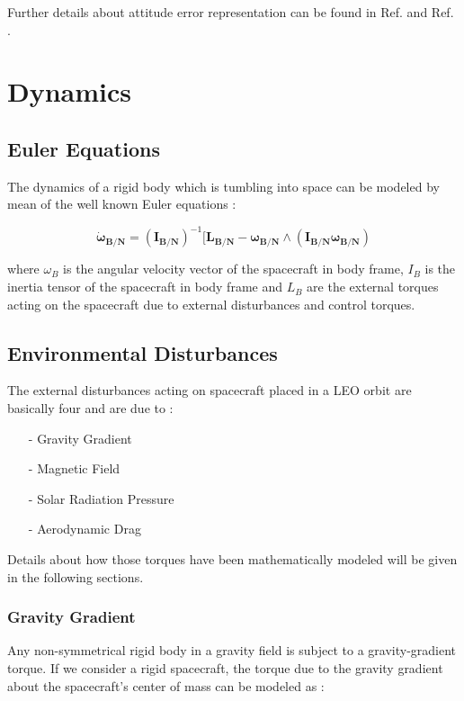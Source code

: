 \documentclass[11pt,a4paper]{report}
\begin{document}
Further details about attitude error representation can be found in Ref. \cite{notes:bigss} and Ref. \cite{Ref:Books:Fundamentals}.
\section{Dynamics}
\subsection{Euler Equations}
The dynamics of a rigid body which is tumbling into space can be modeled by mean of the well known Euler equations : 

\begin{equation}
  \mathbf{\dot{\omega}_{B/N}} = \mathbf{(I_{B/N})}^{-1} [\mathbf{L_{B/N}} - \mathbf{\omega_{B/N}}  \wedge (\mathbf{I_{B/N}} \mathbf{\omega_{B/N}})
\end{equation}

where \textbf{$\omega_B$} is the angular velocity vector of the spacecraft in body frame, \textbf{$I_B$} is the inertia tensor of the spacecraft in body frame and \textbf{$L_B$} are the external torques acting on the spacecraft due to  external disturbances and control torques.

\subsection{Environmental Disturbances} \label{sec:disturbances}
The external disturbances acting on spacecraft placed in a LEO orbit are basically four and are due to :

\begin{itemize}
  \item[-] Gravity Gradient
  \item[-] Magnetic Field 
  \item[-] Solar Radiation Pressure
  \item[-] Aerodynamic Drag
\end{itemize}

Details about how those torques have been mathematically modeled will be given in the following sections.

\subsubsection{Gravity Gradient}
Any non-symmetrical rigid body in a gravity field is subject to a gravity-gradient torque.
If we consider a rigid spacecraft, the torque due to the gravity gradient about the spacecraft's center of mass can be modeled as :
\end{document}
